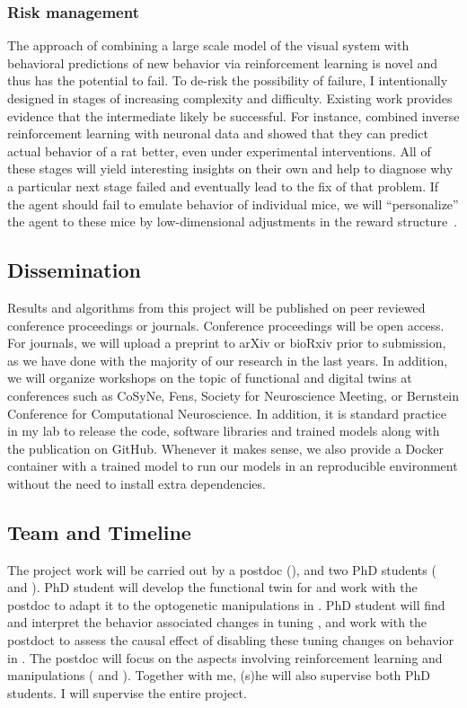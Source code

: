 \documentclass[B2,COG]{ercgrant}
\begin{document}
\subsubsection{Risk management} 
The approach of combining a large scale model of the visual system with behavioral predictions of new behavior via reinforcement learning is novel and thus has the potential to fail. 
To de-risk the possibility of failure, I intentionally designed  in stages of increasing complexity and difficulty. 
Existing work provides evidence that the intermediate likely be successful.  
For instance, \textcite{Kalweit2022-ev} combined inverse reinforcement learning with neuronal data and showed that they can predict actual behavior of a rat better, even under experimental interventions. 
All of these stages will yield interesting insights on their own and help to diagnose why a particular next stage failed and eventually lead to the fix of that problem. If the agent should fail to emulate behavior of individual mice, we will ``personalize'' the agent to these mice by low-dimensional adjustments in the reward structure~\parencite{Kwon2020-qb}.

\subsection{Dissemination}
Results and algorithms from this project will be published on peer reviewed conference proceedings or journals. 
Conference proceedings will be open access.
For journals, we will upload a preprint to arXiv or bioRxiv prior to submission, as we have done with the majority of our research in the last years. 
In addition, we will organize workshops on the topic of functional and digital twins at conferences such as CoSyNe, Fens, Society for Neuroscience Meeting, or Bernstein Conference for Computational Neuroscience.
In addition, it is standard practice in my lab to release the code, software libraries and trained models along with the publication on GitHub.
Whenever it makes sense, we also provide a Docker container with a trained model to run our models in an reproducible environment without the need to install extra dependencies. 

\subsection{Team and Timeline}
The project work will be carried out by a postdoc (), and two PhD students ( and ). 
PhD student  will develop the functional twin for  and work with the postdoc to adapt it to the optogenetic manipulations in .
PhD student  will find and interpret the behavior associated changes in tuning , and work with the postdoct to assess the causal effect of disabling these tuning changes on behavior in .
The postdoc  will focus on the aspects involving reinforcement learning and manipulations ( and ). 
Together with me, (s)he will also supervise both PhD students.
I will supervise the entire project.
\end{document}
